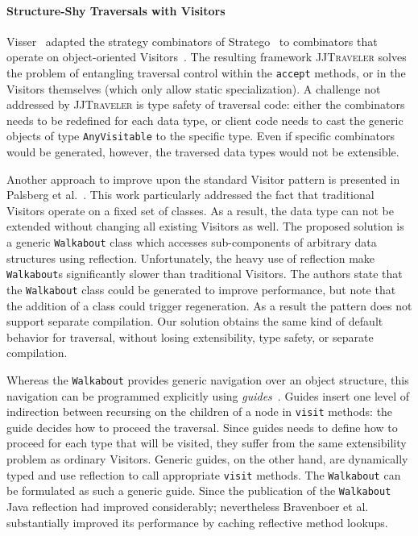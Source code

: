 \paragraph{Structure-Shy Traversals with Visitors}
Visser~\cite{visser01visitor} adapted the strategy combinators of Stratego~\cite{visser1998core,Visser:1998:BPO:289423.289425} to combinators that operate on object-oriented Visitors~\cite{gof}.
The resulting framework \textsc{JJTraveler} solves the problem of entangling traversal control within the \lstinline{accept} methods, or in the Visitors themselves (which only allow static specialization).
A challenge not addressed by \textsc{JJTraveler} is type safety of traversal code: either the combinators needs to be redefined for each data type, or client code needs to cast the generic objects of type \lstinline{AnyVisitable} to the specific type.
Even if specific combinators would be generated, however, the traversed data types would not be extensible.

Another approach to improve upon the standard Visitor pattern is presented in Palsberg et al.~\cite{palsberg98essence}.
This work particularly addressed the fact that traditional Visitors operate on a fixed set of classes. As a result, the data type can not be extended without changing all existing Visitors as well.
The proposed solution is a generic \lstinline{Walkabout} class which accesses sub-components of arbitrary data structures using reflection.
Unfortunately, the heavy use of reflection make \lstinline{Walkabout}s significantly slower than traditional Visitors.
The authors  state that the \lstinline{Walkabout} class could be generated to improve performance, but note that the addition of a class could trigger regeneration. As a result the pattern does not support separate compilation.
Our solution obtains the same kind of default behavior for traversal,  without losing extensibility, type safety, or separate compilation.

Whereas the \lstinline{Walkabout} provides generic navigation over an object structure, this navigation can be programmed explicitly using \textit{guides}~\cite{bravenboer2001guiding}.
Guides insert one level of indirection between recursing on the children of a node in \lstinline{visit} methods: the guide decides how to proceed the traversal.
Since guides needs to define how to proceed for each type that will be visited, they suffer from the same extensibility problem
as ordinary Visitors.
Generic guides, on the other hand, are dynamically typed and use reflection to call appropriate \lstinline{visit} methods.
The \lstinline{Walkabout} can be formulated as such a generic guide.
Since the publication of the \lstinline{Walkabout} \cite{palsberg98essence} Java reflection had improved considerably; nevertheless Bravenboer et al. substantially improved its performance by caching reflective method lookups.



